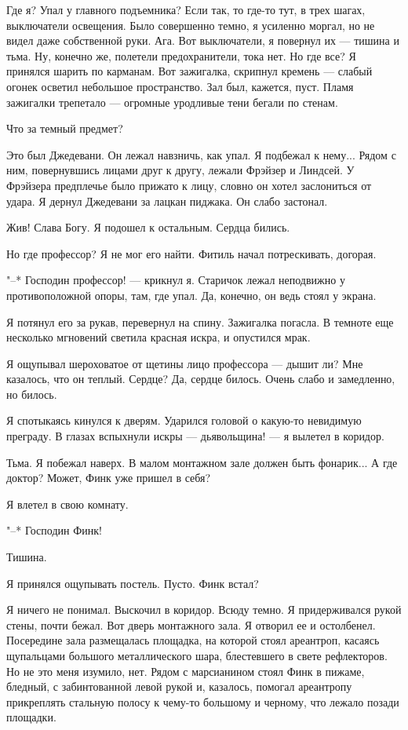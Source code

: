 Где я? Упал у главного подъемника? Если так,  то  где-то  тут,  в  трех
шагах, выключатели освещения. Было совершенно темно, я усиленно моргал, но
не видел даже собственной руки. Ага. Вот  выключатели,  я  повернул  их  ---
тишина и тьма. Ну, конечно же, полетели предохранители, тока нет.  Но  где
все? Я принялся шарить по карманам.  Вот  зажигалка,  скрипнул  кремень  ---
слабый огонек осветил небольшое  пространство.  Зал  был,  кажется,  пуст.
Пламя зажигалки трепетало --- огромные уродливые тени бегали по стенам.

Что за темный предмет?

Это был Джедевани. Он лежал навзничь, как упал. Я  подбежал  к  нему...
Рядом с ним, повернувшись лицами друг к другу, лежали Фрэйзер и Линдсей. У
Фрэйзера предплечье было прижато к лицу, словно он  хотел  заслониться  от
удара. Я дернул Джедевани за лацкан пиджака. Он слабо застонал.

Жив! Слава Богу. Я подошел к остальным. Сердца бились.

Но где профессор? Я  не  мог  его  найти.  Фитиль  начал  потрескивать,
догорая.

"--*  Господин  профессор!  ---  крикнул  я.  Старичок  лежал  неподвижно  у
противоположной опоры, там, где упал. Да, конечно, он ведь стоял у экрана.

Я потянул его за рукав,  перевернул  на  спину.  Зажигалка  погасла.  В
темноте еще несколько мгновений светила красная искра, и опустился мрак.

Я ощупывал шероховатое от  щетины  лицо  профессора  ---  дышит  ли?  Мне
казалось, что  он  теплый.  Сердце?  Да,  сердце  билось.  Очень  слабо  и
замедленно, но билось.

Я спотыкаясь кинулся к дверям. Ударился головой  о  какую-то  невидимую
преграду. В глазах вспыхнули искры --- дьявольщина! --- я вылетел в коридор.

Тьма. Я побежал наверх. В малом монтажном зале должен быть фонарик... А
где доктор? Может, Финк уже пришел в себя?

Я влетел в свою комнату.

"--* Господин Финк!

Тишина.

Я принялся ощупывать постель. Пусто. Финк встал?

Я ничего не понимал. Выскочил в коридор. Всюду темно.  Я  придерживался
рукой стены, почти бежал. Вот  дверь  монтажного  зала.  Я  отворил  ее  и
остолбенел.  Посередине  зала  размещалась  площадка,  на  которой   стоял
ареантроп, касаясь щупальцами большого металлического шара, блестевшего  в
свете рефлекторов. Но не это меня изумило, нет. Рядом с марсианином  стоял
Финк в пижаме, бледный, с забинтованной левой рукой и,  казалось,  помогал
ареантропу прикреплять стальную полосу к чему-то большому и  черному,  что
лежало позади площадки.

